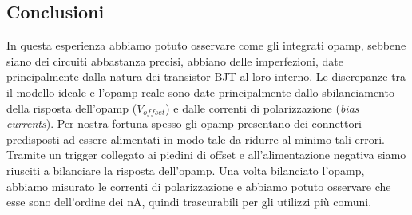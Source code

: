 \subsection{Conclusioni}
In questa esperienza abbiamo potuto osservare come gli integrati opamp, sebbene siano dei circuiti abbastanza precisi, abbiano delle imperfezioni, date principalmente dalla natura dei transistor BJT al loro interno.
Le discrepanze tra il modello ideale e l'opamp reale sono date principalmente dallo sbilanciamento della risposta dell'opamp ($V_{offset}$) e dalle correnti di polarizzazione (\textit{bias currents}).
Per nostra fortuna spesso gli opamp presentano dei connettori predisposti ad essere alimentati in modo tale da ridurre al minimo tali errori.
Tramite un trigger collegato ai piedini di offset e all'alimentazione negativa siamo riusciti a bilanciare la risposta dell'opamp.
Una volta bilanciato l'opamp, abbiamo misurato le correnti di polarizzazione e abbiamo potuto osservare che esse sono dell'ordine dei \si{\nano\ampere}, quindi trascurabili per gli utilizzi più comuni.
